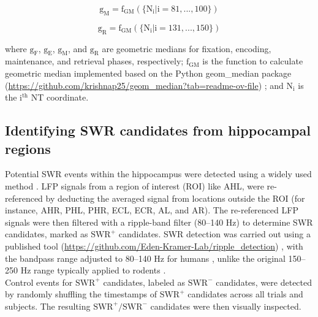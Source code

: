 \documentclass[preprint,review,12pt]{elsarticle}%
\begin{document}
\begin{equation}
\mathrm{g_M = f_{GM}(\{N_{i} | i = 81, ..., 100\})}
\end{equation}

\begin{equation}
\mathrm{g_R = f_{GM}(\{N_{i} | i = 131, ..., 150\})}
\end{equation}

where $\mathrm{g_{F}}$, $\mathrm{g_{E}}$, $\mathrm{g_{M}}$, and $\mathrm{g_{R}}$ are geometric medians for fixation, encoding, maintenance, and retrieval phases, respectively; $\mathrm{f_{GM}}$ is the function to calculate geometric median implemented based on the Python geom\_median package (\url{https://github.com/krishnap25/geom_median?tab=readme-ov-file}) \cite{pillutla:etal:rfa}; and $\mathrm{N_{i}}$ is the $\mathrm{i^{th}}$ NT coordinate.

\indent
\subsection{Identifying SWR candidates from hippocampal regions}
Potential SWR events within the hippocampus were detected using a widely used method \cite{liu_consensus_2022}. LFP signals from a region of interest (ROI) like AHL, were re-referenced by deducting the averaged signal from locations outside the ROI (for instance, AHR, PHL, PHR, ECL, ECR, AL, and AR). The re-referenced LFP signals were then filtered with a ripple-band filter (80--140 Hz) to determine SWR candidates, marked as $\textrm{SWR}^+$ candidates. SWR detection was carried out using a published tool (\url{https://github.com/Eden-Kramer-Lab/ripple_detection}) \cite{kay_hippocampal_2016}, with the bandpass range adjusted to 80--140 Hz for humans \cite{norman_hippocampal_2019, norman_hippocampal_2021, liu_consensus_2022}, unlike the original 150--250 Hz range typically applied to rodents \cite{foster_reverse_2006, karlsson_awake_2009, carr_hippocampal_2011, pfeiffer_hippocampal_2013, jadhav_awake_2012, singer_hippocampal_2013, buzsaki_hippocampal_2015, wu_hippocampal_2017, fernandez-ruiz_long-duration_2019}.
\\
\indent
Control events for $\textrm{SWR}^+$ candidates, labeled as $\textrm{SWR}^-$ candidates, were detected by randomly shuffling the timestamps of $\textrm{SWR}^+$ candidates across all trials and subjects. The resulting $\textrm{SWR}^+/\textrm{SWR}^-$ candidates were then visually inspected.
\\
\indent
\end{document}
